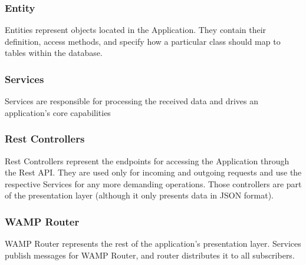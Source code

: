\documentclass[thesis=B,english]{FITthesis}[2019/03/06]
\begin{document}
\subsubsection{Entity}
Entities represent objects located in the Application. They contain their definition, access methods, and specify how a particular class should map to tables within the database. 
\subsubsection{Services}
Services are responsible for processing the received data and   drives an application's core capabilities
\subsubsection{Rest Controllers}
Rest Controllers represent the endpoints for accessing the Application through the Rest API. They are used only for incoming and outgoing requests and use the respective Services for any more demanding operations. Those controllers are part of the presentation layer (although it only presents data in JSON format).
\subsubsection{WAMP Router}
WAMP Router represents the rest of the application's presentation layer.   Services publish messages for WAMP Router, and router distributes it to all subscribers.
 
\end{document}
